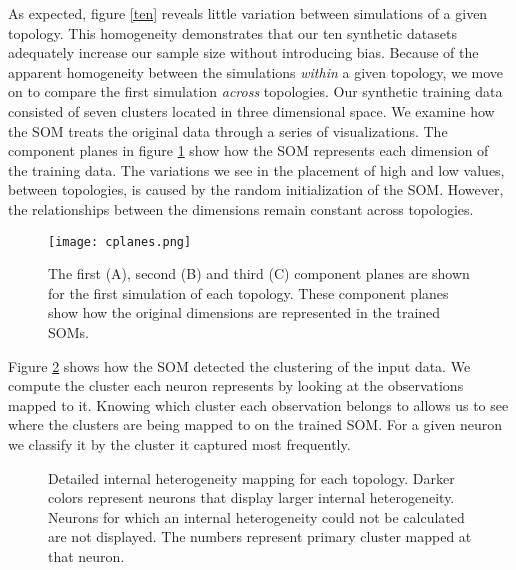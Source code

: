 As expected, figure \ref{ten} reveals little variation 
between simulations of a given topology.  This homogeneity demonstrates that
our ten synthetic datasets adequately increase our sample size without introducing bias.  
Because of the apparent homogeneity between the simulations \emph{within} a
given topology, we move on to compare the first simulation \emph{across} topologies.  
Our synthetic training data consisted of seven clusters located in three
dimensional space. We examine how the SOM treats the original data through a
series of visualizations.  The component planes in figure \ref{cplanes} show
how the SOM represents each dimension of the training data.  The variations we
see in the placement of high and low values, between topologies, is caused by
the random initialization of the SOM.  However, the relationships between the
dimensions remain constant across topologies. 

\begin{figure}[htb]
\begin{minipage}{\textwidth}
  \texttt{[image: cplanes.png]}
  \caption{The first (A), second (B) and third (C) component planes are shown
for the first simulation of each topology.  These component planes show how
the original dimensions are represented in the trained SOMs.}
  \label{cplanes}
\end{minipage}\end{figure}



Figure \ref{cluster} shows how the SOM detected the clustering of the input
data.  We compute the cluster each neuron represents by looking at the
observations mapped to it.  Knowing which cluster each observation belongs to
allows us to see where the clusters are being mapped to on the trained SOM. For a
given neuron we classify it by the cluster it captured most frequently. 

\begin{figure}[htb]
\centering
\begin{minipage}{\textwidth}
\caption{Detailed internal heterogeneity mapping for each topology. Darker colors
represent neurons that display larger internal heterogeneity. Neurons for which
an internal heterogeneity could not be calculated are not displayed. The numbers
represent primary cluster mapped at that neuron.}
\label{cluster}
\end{minipage}
\end{figure}

